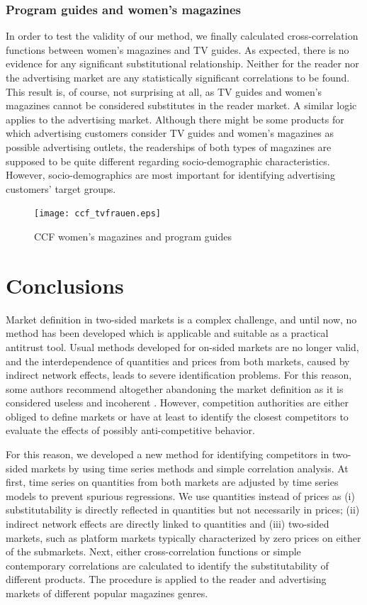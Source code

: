 \documentclass[12pt,a4paper,notitlepage]{article}
\begin{document}
\subsubsection{Program guides and women's magazines }

In order to test the validity of our method, we finally calculated cross-correlation functions between women's magazines and TV guides. As expected, there is no evidence for any significant substitutional relationship. Neither for the reader nor the advertising market are any statistically significant correlations to be found. This result is, of course, not surprising at all, as TV guides and women's magazines cannot be considered substitutes in the reader market. A similar logic applies to the advertising market. Although there might be some products for which advertising customers consider TV guides and women's magazines as possible advertising outlets, the readerships of both types of magazines are supposed to be quite different regarding socio-demographic characteristics. However, socio-demographics are most important for identifying advertising customers' target groups.

\begin{figure}[H]
\caption{CCF women's magazines and program guides}
\label{ccf_tvfrauen}
	\centering
	\texttt{[image: ccf\_tvfrauen.eps]}
\end{figure}

\section{Conclusions}

Market definition in two-sided markets is a complex challenge, and until now, no method has been developed which is applicable and suitable as a practical antitrust tool. Usual methods developed for on-sided markets are no longer valid, and the interdependence of quantities and prices from both markets, caused by indirect network effects, leads to severe identification problems. For this reason, some authors recommend altogether abandoning the market definition as it is considered useless and incoherent \citep{noel_analyzing_2005, kaplow_market_2014}. However, competition authorities are either obliged to define markets or have at least to identify the closest competitors to evaluate the effects of possibly anti-competitive behavior.     

For this reason, we developed a new method for identifying competitors in two-sided markets by using time series methods and simple correlation analysis. At first, time series on quantities from both markets are adjusted by time series models to prevent spurious regressions. We use quantities instead of prices as (i) substitutability is directly reflected in quantities but not necessarily in prices; (ii) indirect network effects are directly linked to quantities and (iii) two-sided markets, such as platform markets typically characterized by zero prices on either of the submarkets. Next, either cross-correlation functions or simple contemporary correlations are calculated to identify the substitutability of different products. The procedure is applied to the reader and advertising markets of different popular magazines genres. 
\end{document}
